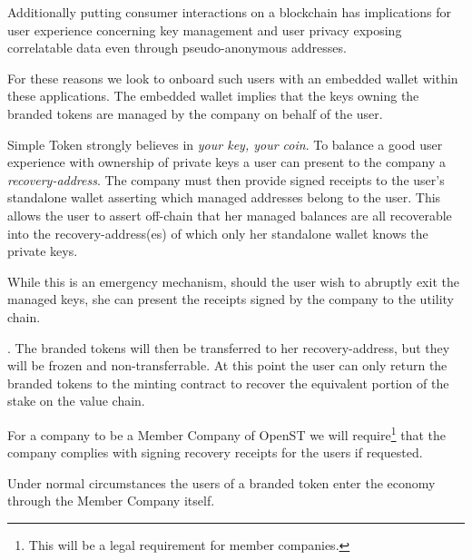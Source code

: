 \documentclass[12pt,a4paper, twocolumn]{article}
\begin{document}
Additionally putting consumer interactions on a blockchain has implications for user experience concerning key management and user privacy exposing correlatable data even through pseudo-anonymous addresses. \par
For these reasons we look to onboard such users with an embedded wallet within these applications.  The embedded wallet implies that the keys owning the branded tokens are managed by the company on behalf of the user. \par
Simple Token strongly believes in \textit{your key, your coin}.  To balance a good user experience with ownership of private keys a user can present to the company a \textit{recovery-address}.  The company must then provide signed receipts to the user’s standalone wallet asserting which managed addresses belong to the user.  This allows the user to assert off-chain that her managed balances are all recoverable into the recovery-address(es) of which only her standalone wallet knows the private keys. \par
While this is an emergency mechanism, should the user wish to abruptly exit the managed keys, she can present the receipts signed by the company to the utility chain.\par.
The branded tokens will then be transferred to her recovery-address, but they will be frozen and non-transferrable. At this point the user can only return the branded tokens to the minting contract to recover the equivalent portion of the stake on the value chain. \par
For a company to be a Member Company of OpenST we will require\footnote{This will be a legal requirement for member companies.} that the company complies with signing recovery receipts for the users if requested. \par
Under normal circumstances the users of a branded token enter the economy through the Member Company itself. \par
\end{document}
